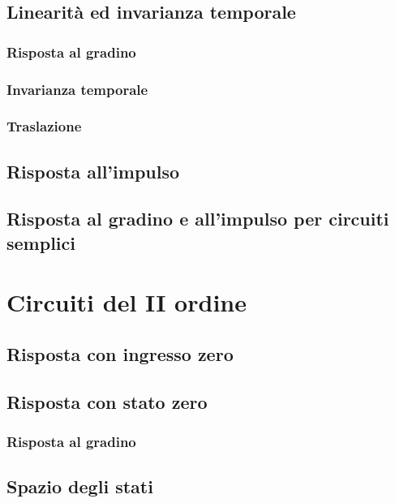\documentclass[a4paper,12pt]{article}
\theoremstyle{mystyle}
\begin{document}
\subsection{Linearità ed invarianza temporale}
\subsubsection{Risposta al gradino}

\subsubsection{Invarianza temporale}

\subsubsection{Traslazione}

\subsection{Risposta all'impulso}

\subsection{Risposta al gradino e all'impulso per circuiti semplici}



\section{Circuiti del II ordine}
\subsection{Risposta con ingresso zero}

\subsection{Risposta con stato zero}

\subsubsection{Risposta al gradino}

\subsection{Spazio degli stati}
\end{document}
